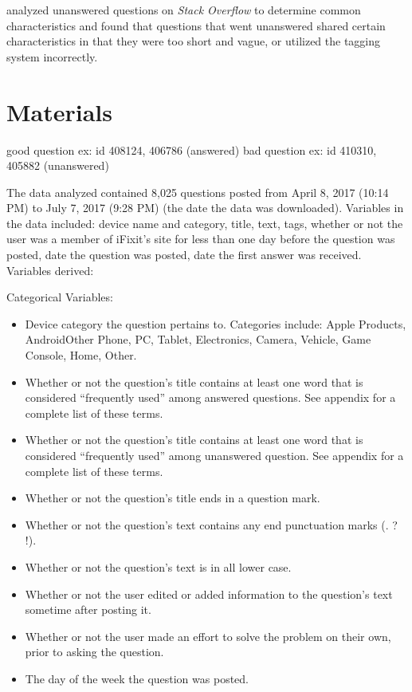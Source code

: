 \documentclass[12pt]{article}
\begin{document}
    \citep{Asaduzzaman2013} analyzed unanswered questions on \textit{Stack Overflow} to determine common characteristics and found that questions that went unanswered shared certain characteristics in that they were too short and vague, or utilized the tagging system incorrectly. 


\section{Materials}

good question ex: id 408124, 406786 (answered)
bad question ex: id 410310, 405882 (unanswered) 

The data analyzed contained 8,025 questions posted from April 8, 2017 (10:14 PM) to July 7, 2017 (9:28 PM) (the date the data was downloaded). Variables in the data included: device name and category, title, text, tags, whether or not the user was a member of iFixit's site for less than one day before the question was posted, date the question was posted, date the first answer was received. Variables derived: 

Categorical Variables: 

\begin{itemize}
  \item Device category the question pertains to. Categories include: Apple Products, Android\/Other Phone, PC, Tablet, Electronics, Camera, Vehicle, Game Console, Home, Other.
  \item Whether or not the question's title contains at least one word that is considered ``frequently used'' among answered questions. See appendix for a complete list of these terms. 
  \item Whether or not the question's title contains at least one word that is considered ``frequently used'' among unanswered question. See appendix for a complete list of these terms. 
  \item Whether or not the question's title ends in a question mark.
  \item Whether or not the question's text contains any end punctuation marks (. ? !). 
  \item Whether or not the question's text is in all lower case. 
  \item Whether or not the user edited or added information to the question's text sometime after posting it.
  \item Whether or not the user made an effort to solve the problem on their own, prior to asking the question.
  \item The day of the week the question was posted. 
\end{itemize}
\end{document}
